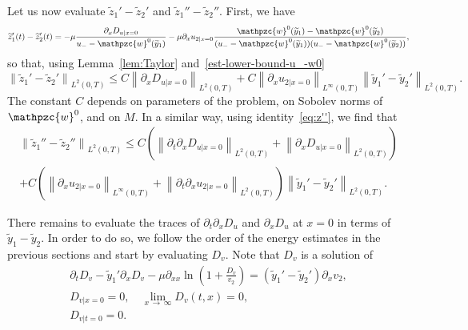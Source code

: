 \documentclass[AHL,Unicode,longabstracts,published]{cedram}
\newcommand{\p}{\partial}
\newcommand{\tw}{\mathpzc{w}}
\newcommand{\ty}{\widetilde{y}}
\newcommand{\tz}{\widetilde{z}}
\newcommand{\dv}{D_v}
\newcommand{\du}{D_u}
\begin{document}
Let us now evaluate $\tz_1'-\tz_2'$ and $\tz_1''-\tz_2''$. First, we have
\[
\tz_1'(t)-\tz_2'(t)=-\mu \frac{\p_x D_{u|x=0}}{u_--\tw^0(\ty_1)} - \mu \p_x u_{2|x=0}\frac{\tw^0(\ty_1)-\tw^0(\ty_2)}{(u_--\tw^0(\ty_1))(u_--\tw^0(\ty_2)) },
\]
so that, using Lemma~\ref{lem:Taylor} and~\eqref{est-lower-bound-u_-w0}
\begin{equation}\label{est:tz'}
\left\|\tz_1'-\tz_2'\right\|_{L^2(0,T)}\leq C \left\| \p_x D_{u|x=0}\right\|_{L^2(0,T)} + C \left\|\p_x u_{2|x=0}\right\|_{L^\infty(0,T)}\left\|\ty_1'-\ty_2'\right\|_{L^2(0,T)}.
\end{equation} The constant $C$ depends on parameters of the problem, on Sobolev norms of $\tw^0$, and on $M$. In a similar way, using identity~\eqref{eq:z''}, we find that
\begin{multline}\label{est:tz''}
\left\|\tz_1''-\tz_2''\right\|_{L^2(0,T)} \leq C \left(\left\|\p_t \p_x D_{u|x=0}\right\|_{L^2(0,T)} + \left\| \p_x D_{u|x=0}\right\|_{L^2(0,T)}\right)\\
+ C \left(\left\|\p_x u_{2|x=0}\right\|_{L^\infty(0,T)} + \left\|\p_t\p_x u_{2|x=0}\right\|_{L^2(0,T)} \right)\left\|\ty_1'-\ty_2'\right\|_{L^2(0,T)}.
\end{multline}


There remains to evaluate the traces of $\p_t\p_x \du$ and $\p_x \du$ at $x=0$ in terms of $\ty_1-\ty_2$. In order to do so, we follow the order of the energy estimates in the previous sections and start by evaluating $\dv$. Note that $\dv$ is a solution of
\begin{align*}
\p_t \dv - \ty_1'\p_x \dv - \mu \p_{xx}\ln \left(1+ \frac{\dv}{v_2}\right)= \left(\ty_1'-\ty_2'\right)\p_x v_2,\\
D_{v|x=0}=0,\quad \lim_{x\,\to\,\infty}\dv(t,x)=0,\\
D_{v|t=0}=0.
\end{align*}
\end{document}
